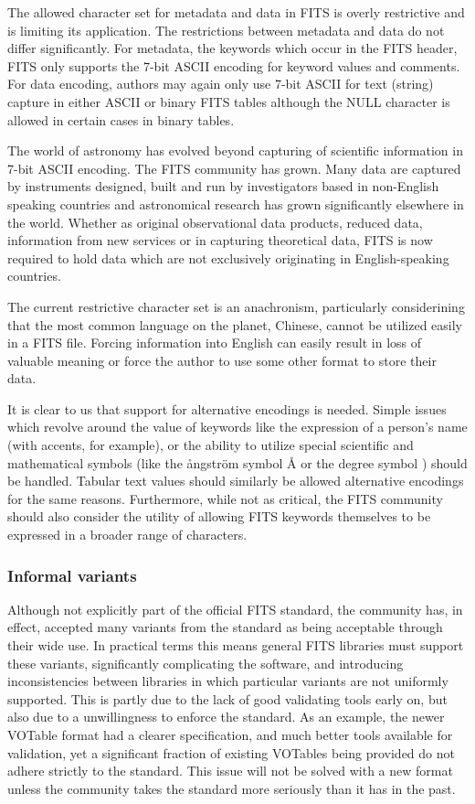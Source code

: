 \documentclass[final,authoryear,5p,times,twocolumn]{elsarticle}
\begin{document}
The allowed character set for metadata and data in FITS is overly
restrictive and is limiting its application. The restrictions between
metadata and data do not differ significantly. For metadata, the
keywords which occur in the FITS header, FITS only supports the 7-bit
ASCII encoding for keyword values and comments. For data encoding,
authors may again only use 7-bit ASCII for text (string) capture in
either ASCII or binary FITS tables although the NULL character is
allowed in certain cases in binary tables.


The world of astronomy has evolved beyond capturing of scientific
information in 7-bit ASCII encoding. The FITS community has grown.
Many data are captured by instruments designed, built and run by
investigators based in non-English speaking countries and astronomical
research has grown significantly elsewhere in the world. Whether as
original observational data products, reduced data, information from new
services or in capturing theoretical data, FITS is now required to hold
data which are not exclusively originating in English-speaking countries.


The current restrictive character set is an
anachronism, particularly considerining that the most common language on the planet,
Chinese, cannot be utilized easily in a FITS file. Forcing information
into English can easily result in loss of valuable meaning or force
the author to use some other format to store their data.


It is clear to us that support for alternative encodings is needed.
Simple issues which revolve around the value of keywords like the
expression of a person's name (with accents, for example), or the
ability to utilize special scientific and mathematical symbols (like the
\r{a}ngstr\"{o}m symbol \r{A} or the degree symbol \degree) should be
handled. Tabular text values should similarly be allowed alternative
encodings for the same reasons.  Furthermore, while not as critical, the
FITS community should also consider the utility of allowing FITS
keywords themselves to be expressed in a broader range of characters.


\subsubsection{Informal variants}


Although not explicitly part of the official FITS standard, the
community has, in effect, accepted many variants from the standard as
being acceptable through their wide use. In practical terms this means
general FITS libraries must support these variants, significantly
complicating the software, and introducing inconsistencies between
libraries in which particular variants are not uniformly
supported. This is partly due to the lack of good validating tools
early on, but also due to a unwillingness to enforce the standard. As
an example, the newer VOTable format \citep{2004tivo.conf..118O} had a
clearer specification, and much better tools available for validation,
yet a significant fraction of existing VOTables being provided do not
adhere strictly to the standard. This issue will not be solved with a
new format unless the community takes the standard more seriously than
it has in the past.
\end{document}
